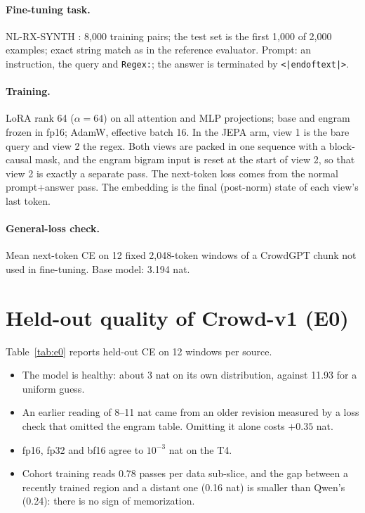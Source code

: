 \documentclass[11pt]{article}
\begin{document}
\paragraph{Fine-tuning task.} NL-RX-SYNTH \cite{locascio2016nlrx}: 8{,}000 training pairs; the test set is the first
1{,}000 of 2{,}000 examples; exact string match as in the reference evaluator. Prompt: an instruction, the query and
\texttt{Regex:}; the answer is terminated by \texttt{<|endoftext|>}.

\paragraph{Training.} LoRA \cite{hu2022lora} rank 64 ($\alpha=64$) on all attention and MLP projections; base and engram
frozen in fp16; AdamW, effective batch 16. In the JEPA arm, view 1 is the bare query and view 2 the regex. Both views
are packed in one sequence with a block-causal mask, and the engram bigram input is reset at the start of view 2, so
that view 2 is exactly a separate pass. The next-token loss comes from the normal prompt+answer pass. The embedding is
the final (post-norm) state of each view's last token.

\paragraph{General-loss check.} Mean next-token CE on 12 fixed 2{,}048-token windows of a CrowdGPT chunk not used in
fine-tuning. Base model: 3.194 nat.

\section{Held-out quality of Crowd-v1 (E0)}
\label{sec:e0}
Table~\ref{tab:e0} reports held-out CE on 12 windows per source.
\begin{itemize}
\item The model is healthy: about 3 nat on its own distribution, against 11.93 for a uniform guess.
\item An earlier reading of 8--11 nat came from an older revision measured by a loss check that omitted the engram
table. Omitting it alone costs $+0.35$ nat.
\item fp16, fp32 and bf16 agree to $10^{-3}$ nat on the T4.
\item Cohort training reads 0.78 passes per data sub-slice, and the gap between a recently trained region and a distant
one (0.16 nat) is smaller than Qwen's (0.24): there is no sign of memorization.
\end{itemize}
\end{document}
